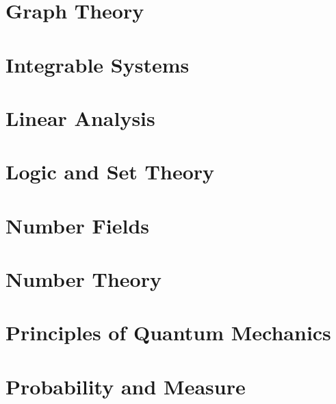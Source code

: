 \chapter{Graph Theory}
\begingroup
\graphicspath{{../part-ii/graph-theory/}}


\endgroup
\chapter{Integrable Systems}
\begingroup
\graphicspath{{../part-ii/integrable-systems/}}


\endgroup
\chapter{Linear Analysis}
\begingroup
\graphicspath{{../part-ii/linear-analysis/}}


\endgroup
\chapter{Logic and Set Theory}
\begingroup
\graphicspath{{../part-ii/logic-and-set-theory/}}


\endgroup
\chapter{Number Fields}
\begingroup
\graphicspath{{../part-ii/number-fields/}}


\endgroup
\chapter{Number Theory}
\begingroup
\graphicspath{{../part-ii/number-theory/}}


\endgroup
\chapter{Principles of Quantum Mechanics}
\begingroup
\graphicspath{{../part-ii/principles-of-quantum-mechanics/}}


\endgroup
\chapter{Probability and Measure}
\begingroup
\graphicspath{{../part-ii/probability-and-measure/}}


\endgroup
